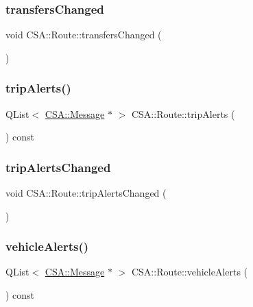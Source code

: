\subsubsection{\texorpdfstring{transfers\+Changed}{transfersChanged}}
{\footnotesize\ttfamily void C\+S\+A\+::\+Route\+::transfers\+Changed (\begin{DoxyParamCaption}{ }\end{DoxyParamCaption})\hspace{0.3cm}{\ttfamily [signal]}}

\mbox{\label{classCSA_1_1Route_a6e5c03d04237cea4167239b201f2d40b}} 
\subsubsection{\texorpdfstring{trip\+Alerts()}{tripAlerts()}}
{\footnotesize\ttfamily Q\+List$<$ \mbox{\hyperlink{classCSA_1_1Message}{C\+S\+A\+::\+Message}} $\ast$ $>$ C\+S\+A\+::\+Route\+::trip\+Alerts (\begin{DoxyParamCaption}{ }\end{DoxyParamCaption}) const}

\mbox{\label{classCSA_1_1Route_afe760a3c1e840dfde35219466fa8c5c3}} 
\subsubsection{\texorpdfstring{trip\+Alerts\+Changed}{tripAlertsChanged}}
{\footnotesize\ttfamily void C\+S\+A\+::\+Route\+::trip\+Alerts\+Changed (\begin{DoxyParamCaption}{ }\end{DoxyParamCaption})\hspace{0.3cm}{\ttfamily [signal]}}

\mbox{\label{classCSA_1_1Route_a173ce470308b9f20ae2273d987c6041f}} 
\subsubsection{\texorpdfstring{vehicle\+Alerts()}{vehicleAlerts()}}
{\footnotesize\ttfamily Q\+List$<$ \mbox{\hyperlink{classCSA_1_1Message}{C\+S\+A\+::\+Message}} $\ast$ $>$ C\+S\+A\+::\+Route\+::vehicle\+Alerts (\begin{DoxyParamCaption}{ }\end{DoxyParamCaption}) const}

